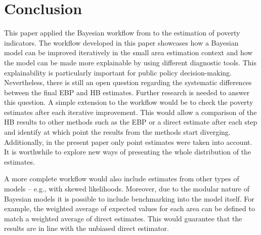 \chapter{Conclusion}

This paper applied the Bayesian workflow from \cite{gelman_bayesian_2020} to the estimation of poverty indicators.
The workflow developed in this paper showcases how a Bayesian model can be improved iteratively in the small area estimation context and how the model can be made more explainable by using different diagnostic tools.
This explainability is particularly important for public policy decision-making.
Nevertheless, there is still an open question regarding the systematic differences between the final EBP and HB estimates.
Further research is needed to answer this question.
A simple extension to the workflow would be to check the poverty estimates after each iterative improvement.
This would allow a comparison of the HB results to other methods such as the EBP or a direct estimate after each step and identify at which point the results from the methods start diverging.
Additionally, in the present paper only point estimates were taken into account.
It is worthwhile to explore new ways of presenting the whole distribution of the estimates.

A more complete workflow would also include estimates from other types of models – e.g., with skewed likelihoods.
Moreover, due to the modular nature of Bayesian models it is possible to include benchmarking \citep{pfeffermann_new_2013} into the model itself.
For example, the weighted average of expected values for each area can be defined to match a weighted average of direct estimates.
This would guarantee that the results are in line with the unbiased direct estimator.
